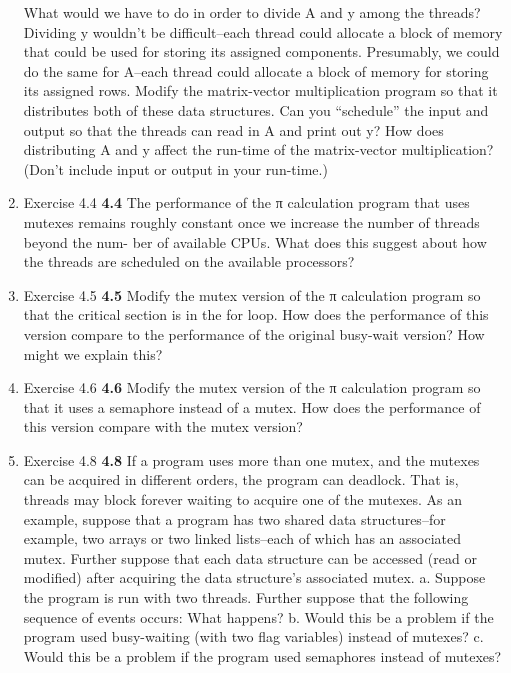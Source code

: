 \message{ !name(hw2.tex)}\documentclass[11pt,epsfig,letterpaper]{article}
\begin{document}
\begin{enumerate}
            What would we have to do in order to divide A and y among the threads? Dividing y wouldn’t be difficult–each thread could allocate a block of memory that could be used for storing its assigned components. Presumably, we could do the same for A–each thread could allocate a block of memory for storing its assigned rows. Modify the matrix-vector multiplication program so that it distributes both of these data structures. Can you “schedule” the input and output so that the threads can read in A and print out y? How does distributing A and y affect the run-time of the matrix-vector multiplication? (Don’t include input or output in your run-time.)
            \vspace{0.5pc}

            \item Exercise 4.4
            {\bf 4.4}\>\> The performance of the π calculation program that uses mutexes remains roughly constant once we increase the number of threads beyond the num- ber of available CPUs. What does this suggest about how the threads are scheduled on the available processors?
            \vspace{0.5pc}

            \item Exercise 4.5
            {\bf 4.5}\>\> Modify the mutex version of the π calculation program so that the critical section is in the for loop. How does the performance of this version compare to the performance of the original busy-wait version? How might we explain this?
            \vspace{0.5pc}

            \item Exercise 4.6
            {\bf 4.6}\>\> Modify the mutex version of the π calculation program so that it uses a semaphore instead of a mutex. How does the performance of this version compare with the mutex version?
            \vspace{0.5pc}

            \item Exercise 4.8
            {\bf 4.8}\>\> If a program uses more than one mutex, and the mutexes can be acquired in different orders, the program can deadlock. That is, threads may block forever waiting to acquire one of the mutexes. As an example, suppose that a program has two shared data structures–for example, two arrays or two linked lists–each of which has an associated mutex. Further suppose that each data structure can be accessed (read or modified) after acquiring the data structure’s associated mutex.
            a. Suppose the program is run with two threads. Further suppose that the following sequence of events occurs:
            What happens?
            b. Would this be a problem if the program used busy-waiting (with two flag variables) instead of mutexes?
            c. Would this be a problem if the program used semaphores instead of mutexes?
            \vspace{0.5pc}





    \end{enumerate}
\end{document}
